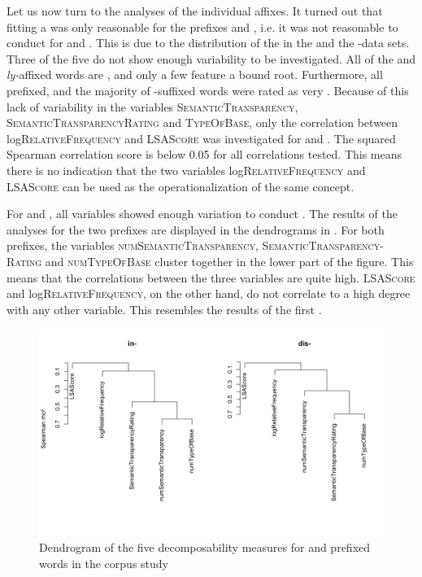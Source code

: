  
 Let us now turn to the analyses of the individual affixes.
 It turned out that fitting a  was only reasonable for the prefixes  and , i.e. it was not reasonable to conduct  for  and . 
 This is due to the distribution of the  in the  and the -data sets. Three of the five  do not show enough variability to be investigated. All of the  and \textit{ly-}affixed words are , and only a few feature a bound root. Furthermore, all prefixed, and the majority of -suffixed words were rated as very . Because of this lack of variability in the variables \textsc{SemanticTransparency}, \textsc{SemanticTransparencyRating} and \textsc{TypeOfBase}, only the correlation between log\textsc{RelativeFrequency} and \textsc{LSAScore} was investigated for  and .
 The squared Spearman correlation score is below 0.05 for all correlations tested. This means there is no indication that the two variables log\textsc{RelativeFrequency} and \textsc{LSAScore} can be used as the operationalization of the same concept.
 
 
 
 
 
 For  and , all variables showed enough variation to conduct . The results of the analyses for the two prefixes are displayed in the dendrograms in . 
 For both prefixes, the variables \textsc{numSemanticTransparency}, \textsc{SemanticTransparency-Rating} and \textsc{numTypeOfBase} cluster together in the lower part of the figure. This means that the correlations between the three variables are quite high. \textsc{LSAScore} and log\textsc{RelativeFrequency}, on the other hand, do not correlate to a high degree with any other variable. This resembles the results of the first .

\begin{figure}  
	
	\includegraphics[scale=0.5]{images/Corpus/clusterAnalysisDecomposabilityCorpusDisAndIn.png}
	\caption{ Dendrogram of the five decomposability measures for  and prefixed words in the corpus study}
	\label{fig:cluster corpus dis and in}
\end{figure}



